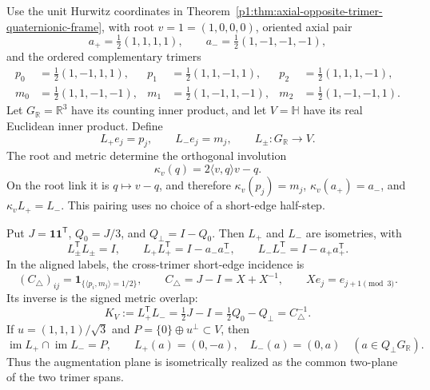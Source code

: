 \documentclass[11pt]{article}
\begin{document}
\begin{theorem}
\label{p1:thm:rooted-trimer-vector-overlap}
Use the unit Hurwitz coordinates in
Theorem~\ref{p1:thm:axial-opposite-trimer-quaternionic-frame},
with root \(v=1=(1,0,0,0)\), oriented axial pair
\[
 a_+=\tfrac12(1,1,1,1),\qquad
 a_-=\tfrac12(1,-1,-1,-1),
\]
and the ordered complementary trimers
\[
\begin{aligned}
 p_0&=\tfrac12(1,-1,1,1),&
 p_1&=\tfrac12(1,1,-1,1),&
 p_2&=\tfrac12(1,1,1,-1),\\
 m_0&=\tfrac12(1,1,-1,-1),&
 m_1&=\tfrac12(1,-1,1,-1),&
 m_2&=\tfrac12(1,-1,-1,1).
\end{aligned}
\]
Let \(G_{\mathbb R}=\mathbb R^3\) have its counting inner product,
and let \(V=\mathbb H\) have its real Euclidean inner product.
Define
\[
 L_+e_j=p_j,\qquad L_-e_j=m_j,
 \qquad L_\pm:G_{\mathbb R}\longrightarrow V.
\]
The root and metric determine the orthogonal involution
\[
 \kappa_v(q)=2\langle v,q\rangle v-q.
\]
On the root link it is \(q\mapsto v-q\), and therefore
\(\kappa_v(p_j)=m_j\), \(\kappa_v(a_+)=a_-\), and
\(\kappa_vL_+=L_-\). This pairing uses no choice of a short-edge
half-step.

Put \(J=\mathbf1\mathbf1^{\mathsf T}\),
\(Q_0=J/3\), and \(Q_\perp=I-Q_0\).
Then \(L_+\) and \(L_-\) are isometries, with
\[
 L_\pm^{\mathsf T}L_\pm=I,\qquad
 L_+L_+^{\mathsf T}=I-a_-a_-^{\mathsf T},\qquad
 L_-L_-^{\mathsf T}=I-a_+a_+^{\mathsf T}.
\]
In the aligned labels, the cross-trimer short-edge incidence is
\[
 (C_\triangle)_{ij}
 =\mathbf1_{\{\langle p_i,m_j\rangle=1/2\}},
 \qquad C_\triangle=J-I=X+X^{-1},
 \qquad Xe_j=e_{j+1\pmod3}.
\]
Its inverse is the signed metric overlap:
\begin{equation}
\label{p1:eq:trimer-vector-inverse-incidence}
 K_V:=L_+^{\mathsf T}L_-
 =\tfrac12J-I=\tfrac12Q_0-Q_\perp=C_\triangle^{-1}.
\end{equation}
If \(u=(1,1,1)/\sqrt3\) and
\(P=\{0\}\oplus u^\perp\subset V\), then
\[
 \operatorname{im}L_+\cap\operatorname{im}L_-=P,
 \qquad L_+(a)=(0,-a),\quad L_-(a)=(0,a)
 \quad(a\in Q_\perp G_{\mathbb R}).
\]
Thus the augmentation plane is isometrically realized as the common
two-plane of the two trimer spans.
\end{theorem}
\end{document}
